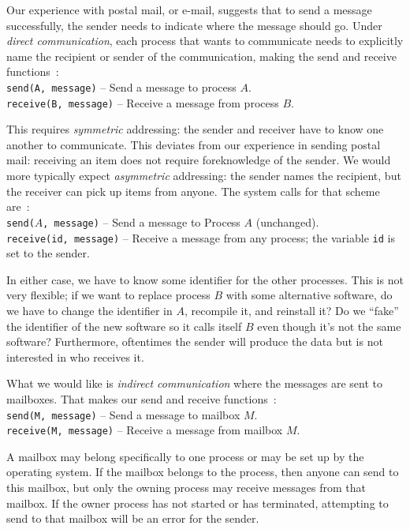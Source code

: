 Our experience with postal mail, or e-mail, suggests that to send a message successfully, the sender needs to indicate where the message should go. Under \textit{direct communication}, each process that wants to communicate needs to explicitly name the recipient or sender of the communication, making the send and receive functions~\cite{osc}:\\
\texttt{send(A, message)} -- Send a message to process $A$.\\
\texttt{receive(B, message)} -- Receive a message from process $B$.

This requires \textit{symmetric} addressing: the sender and receiver have to know one another to communicate. This deviates from our experience in sending postal mail: receiving an item does not require foreknowledge of the sender. We would more typically expect \textit{asymmetric} addressing: the sender names the recipient, but the receiver can pick up items from anyone. The system calls for that scheme are~\cite{osc}:\\
\texttt{send($A$, message)} -- Send a message to Process $A$ (unchanged).\\
\texttt{receive(id, message)} -- Receive a message from any process; the variable \texttt{id} is set to the sender.

In either case, we have to know some identifier for the other processes. This is not very flexible; if we want to replace process $B$ with some alternative software, do we have to change the identifier in $A$, recompile it, and reinstall it? Do we ``fake'' the identifier of the new software so it calls itself $B$ even though it's not the same software? Furthermore, oftentimes  the sender will produce the data but is not interested in who receives it. 

What we would like is \textit{indirect communication} where the messages are sent to mailboxes. That makes our send and receive functions~\cite{osc}:\\
\texttt{send(M, message)} -- Send a message to mailbox $M$.\\
\texttt{receive(M, message)} -- Receive a message from mailbox $M$.

A mailbox may belong specifically to one process or may be set up by the operating system. If the mailbox belongs to the process, then anyone can send to this mailbox, but only the owning process may receive messages from that mailbox. If the owner process has not started or has terminated, attempting to send to that mailbox will be an error for the sender.


